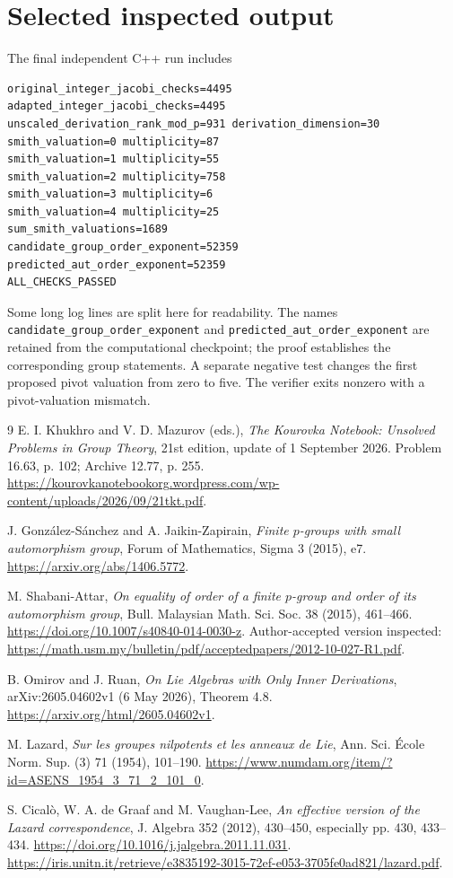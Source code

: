 \documentclass[11pt]{article}
\theoremstyle{definition}\newtheorem{definition}[theorem]{Definition}
\theoremstyle{remark}\newtheorem{remark}[theorem]{Remark}
\begin{document}
\section{Selected inspected output}
The final independent C++ run includes
\begin{verbatim}
original_integer_jacobi_checks=4495
adapted_integer_jacobi_checks=4495
unscaled_derivation_rank_mod_p=931 derivation_dimension=30
smith_valuation=0 multiplicity=87
smith_valuation=1 multiplicity=55
smith_valuation=2 multiplicity=758
smith_valuation=3 multiplicity=6
smith_valuation=4 multiplicity=25
sum_smith_valuations=1689
candidate_group_order_exponent=52359
predicted_aut_order_exponent=52359
ALL_CHECKS_PASSED
\end{verbatim}
Some long log lines are split here for readability. The names
\texttt{candidate\_group\_order\_exponent} and
\texttt{predicted\_aut\_order\_exponent} are retained from the computational
checkpoint; the proof establishes the corresponding group statements.
A separate negative test changes the first proposed pivot valuation from
zero to five. The verifier exits nonzero with a pivot-valuation mismatch.

\begin{thebibliography}{9}
E. I. Khukhro and V. D. Mazurov (eds.),
\emph{The Kourovka Notebook: Unsolved Problems in Group Theory},
21st edition, update of 1 September 2026. Problem 16.63, p. 102;
Archive 12.77, p. 255.
\url{https://kourovkanotebookorg.wordpress.com/wp-content/uploads/2026/09/21tkt.pdf}.

J. Gonz\'alez-S\'anchez and A. Jaikin-Zapirain,
\emph{Finite $p$-groups with small automorphism group},
Forum of Mathematics, Sigma 3 (2015), e7.
\url{https://arxiv.org/abs/1406.5772}.

M. Shabani-Attar,
\emph{On equality of order of a finite $p$-group and order of its automorphism group},
Bull. Malaysian Math. Sci. Soc. 38 (2015), 461--466.
\url{https://doi.org/10.1007/s40840-014-0030-z}.
Author-accepted version inspected:
\url{https://math.usm.my/bulletin/pdf/acceptedpapers/2012-10-027-R1.pdf}.

B. Omirov and J. Ruan,
\emph{On Lie Algebras with Only Inner Derivations},
arXiv:2605.04602v1 (6 May 2026), Theorem 4.8.
\url{https://arxiv.org/html/2605.04602v1}.

M. Lazard,
\emph{Sur les groupes nilpotents et les anneaux de Lie},
Ann. Sci. \'Ecole Norm. Sup. (3) 71 (1954), 101--190.
\url{https://www.numdam.org/item/?id=ASENS_1954_3_71_2_101_0}.

S. Cical\`o, W. A. de Graaf and M. Vaughan-Lee,
\emph{An effective version of the Lazard correspondence},
J. Algebra 352 (2012), 430--450, especially pp. 430, 433--434.
\url{https://doi.org/10.1016/j.jalgebra.2011.11.031}.
\url{https://iris.unitn.it/retrieve/e3835192-3015-72ef-e053-3705fe0ad821/lazard.pdf}.
\end{thebibliography}
\end{document}
